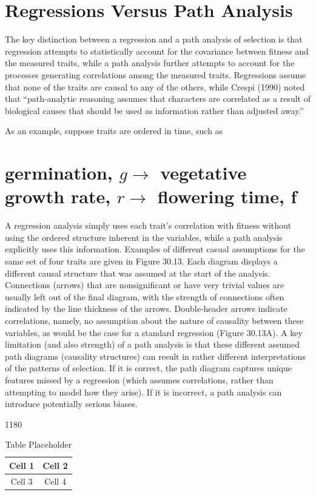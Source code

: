 \documentclass{article}
\begin{document}
\section{Regressions Versus Path Analysis}
The key distinction between a regression and a path analysis of selection is that regression attempts to statistically account for the covariance between fitness and the measured traits, while a path analysis further attempts to account for the processes generating correlations among the measured traits. Regressions assume that none of the traits are causal to any of the others, while Crespi (1990) noted that “path-analytic reasoning assumes that characters are correlated as a result of biological causes that should be used as information rather than adjusted away.”

As an example, suppose traits are ordered in time, such as

\section{germination,  $ g \rightarrow $ vegetative growth rate,  $ r \rightarrow $ flowering time, f}
A regression analysis simply uses each trait's correlation with fitness without using the ordered structure inherent in the variables, while a path analysis explicitly uses this information. Examples of different casual assumptions for the same set of four traits are given in Figure 30.13. Each diagram displays a different causal structure that was assumed at the start of the analysis. Connections (arrows) that are nonsignificant or have very trivial values are usually left out of the final diagram, with the strength of connections often indicated by the line thickness of the arrows. Double-header arrows indicate correlations, namely, no assumption about the nature of causality between these variables, as would be the case for a standard regression (Figure 30.13A). A key limitation (and also strength) of a path analysis is that these different assumed path diagrams (causality structures) can result in rather different interpretations of the patterns of selection. If it is correct, the path diagram captures unique features missed by a regression (which assumes correlations, rather than attempting to model how they arise). If it is incorrect, a path analysis can introduce potentially serious biases.

1180

\begin{table}[h]
\centering
\begin{tabular}{|c|c|}
\hline
Cell 1 & Cell 2 \\
\hline
Cell 3 & Cell 4 \\
\hline
\end{tabular}
\caption{Table Placeholder}
\end{table}
\end{document}
